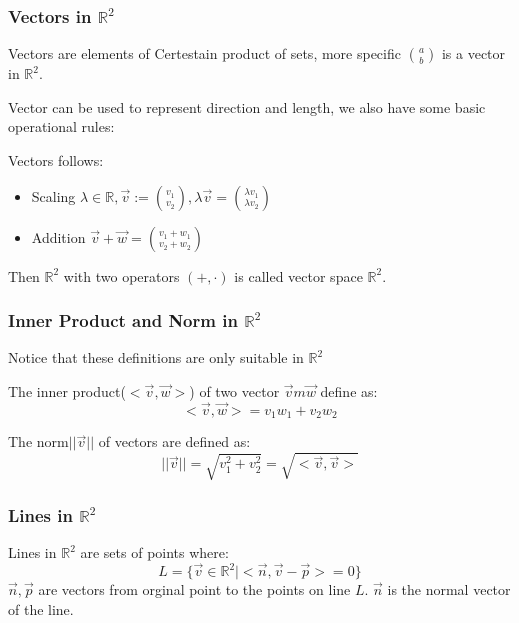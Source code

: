\documentclass{article}
\newcommand{\R}{\mathbb{R}}
\begin{document}
\subsubsection{Vectors in $\R^2$}
\begin{definition}
	Vectors are elements of Certestain product of sets, more specific ${a\choose b}$ is a vector in $\R^2$.
\end{definition}

Vector can be used to represent direction and length, we also have some basic operational rules:
\begin{theorem}
Vectors follows:
	\begin{itemize}
		\item Scaling $\lambda\in \R , \vec{v}:= {v_1\choose v_2},\lambda \vec{v}={\lambda v_1 \choose \lambda v_2}$
		\item Addition $\vec{v}+\vec{w}={v_1+w_1\choose v_2+w_2}$
	\end{itemize}
\end{theorem}

Then $\R^2$ with two operators $(+,\cdot)$ is called vector space $\R^2$.

\subsubsection{Inner Product and Norm in $\R^2$}
Notice that these definitions are only suitable in $\R^2$
\begin{definition}
	The inner product($<\vec{v},\vec{w}>$) of two vector $\vec{v}m\vec{w}$ define as:
	\begin{equation*}
		<\vec{v},\vec{w} >=v_1w_1+v_2w_2
	\end{equation*}
\end{definition}

\begin{definition}
	The norm$||\vec{v}||$ of vectors are defined as:
	\begin{equation*}
		||\vec{v}||=\sqrt{v_1^2+v_2^2}=\sqrt{<\vec{v},\vec{v}>}
	\end{equation*}
\end{definition}


\subsubsection{Lines in $\R^2$}
\begin{definition}
	Lines in $\R^2$ are sets of points where:
	\begin{equation*}
		L=\{\vec{v}\in \R^2| <\vec{n},\vec{v}-\vec{p}>=0 \}
	\end{equation*}
	$\vec{n},\vec{p}$ are vectors from orginal point to the points on line $L$. $\vec{n}$ is the normal vector of the line.
\end{definition}
\end{document}
